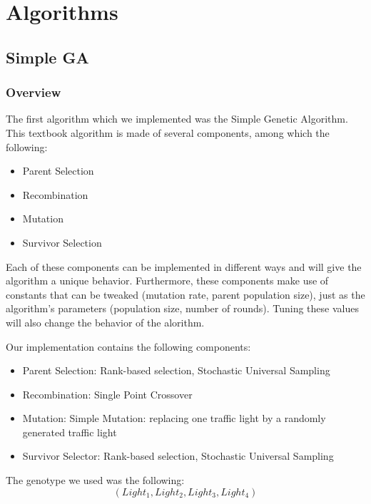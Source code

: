 \documentclass{article} %
\begin{document}
\section{Algorithms}

\subsection{Simple GA}

\subsubsection{Overview}
The first algorithm which we implemented was the Simple Genetic Algorithm. This textbook algorithm is made of several components, among which the following:
\begin{itemize}
 \item Parent Selection
 \item Recombination
 \item Mutation
 \item Survivor Selection
\end{itemize}
Each of these components can be implemented in different ways and will give the algorithm a unique behavior. Furthermore, these components make use of constants that can be tweaked (mutation rate, parent population size), just as the algorithm's parameters (population size, number of rounds). Tuning these values will also change the behavior of the alorithm.

Our implementation contains the following components:
\begin{itemize}
 \item Parent Selection: Rank-based selection, Stochastic Universal Sampling
 \item Recombination: Single Point Crossover
 \item Mutation: Simple Mutation: replacing one traffic light by a randomly generated traffic light
 \item Survivor Selector: Rank-based selection, Stochastic Universal Sampling
\end{itemize}

The genotype we used was the following:
\begin{equation}
  (Light_1, Light_2, Light_3, Light_4)
\end{equation}
\end{document}

